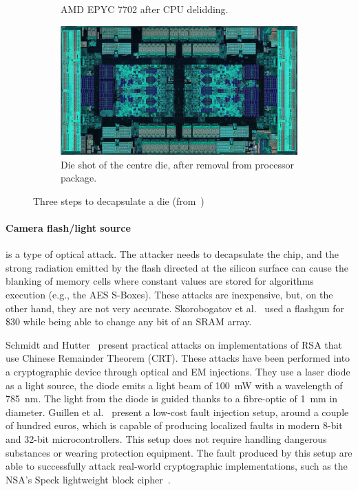 \begin{figure}[ht]
\begin{subfigure}[b]{0.3\textwidth}
        \caption{\hfill AMD EPYC 7702 after CPU delidding.}
        \label{fig:delidding_die}
    \end{subfigure}
    \hfill
    \begin{subfigure}[b]{0.3\textwidth}
        \includegraphics[width=\textwidth]{c2_soa/img/epyc_7702_packagedRemoved.jpg}
        \caption{\hfill Die shot of the centre die, after removal from processor package.}
        \label{fig:packagedRemoved_die}
    \end{subfigure}
    \caption{Three steps to decapsulate a die (from~\cite{decapping-19-wikipedia})}
    \label{fig:decapsulating_die}
\end{figure}


\paragraph{Camera flash/light source} is a type of optical attack. The attacker needs to decapsulate the chip, and the strong radiation emitted by the flash directed at the silicon surface can cause the blanking of memory cells where constant values are stored for algorithms execution (e.g., the AES S-Boxes). These attacks are inexpensive, but, on the other hand, they are not very accurate. Skorobogatov et al.~\cite{SA-02-ches} used a flashgun for \$30 while being able to change any bit of an SRAM array.

Schmidt and Hutter~\cite{SH-07-austrochip} present practical attacks on implementations of RSA that use Chinese Remainder Theorem (CRT). These attacks have been performed into a cryptographic device through optical and EM injections. They use a laser diode  as a light source, the diode emits a light  beam of \SI{100}{\milli\watt} with a wavelength of \SI{785}{\nano\metre}. The light from the diode is guided thanks to a fibre-optic of 1~mm in diameter.
Guillen et al.~\cite{GGD-17-cosade} present a low-cost fault injection setup, around a couple of hundred euros, which is capable of producing localized faults in modern 8-bit and 32-bit microcontrollers. This setup does not require handling dangerous substances or wearing protection equipment. The fault produced by this setup are able to successfully attack real-world cryptographic implementations, such as the NSA’s Speck lightweight block cipher~\cite{RDJSBL-13-nsa,BTSWSW-15-dac}.

